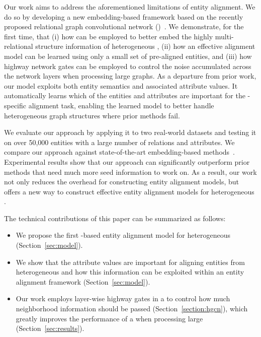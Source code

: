 Our work aims to address the aforementioned limitations of entity alignment. We do so by developing a new embedding-based framework based
on the recently proposed relational graph convolutional network (\RGCN)~\cite{Schlichtkrull2017Modeling}. We demonstrate, for the first
time, that (i) how \RGCNs can be employed to better embed the highly multi-relational structure information of heterogeneous \KGs, (ii) how
an effective alignment model can be learned using only a small set of pre-aligned entities, and (iii) how highway network gates can be
employed to control the noise accumulated across the network layers when processing large graphs. As a departure from prior work, our model
exploits both entity semantics and associated attribute values. It automatically learns which of the entities and attributes are important
for the \KG-specific alignment task, enabling the learned model to better handle heterogeneous graph structures where prior methods fail.

We evaluate our approach by applying it to two real-world datasets and testing it on over 50,000 entities with a large number of relations
and attributes. We compare our approach against state-of-the-art embedding-based
methods~\cite{hao2016joint,chen2016multilingual,sun2017cross,zhu2017iterative}. Experimental results show that our approach can
significantly outperform prior methods that need much more seed information to work on. As a result, our work not only reduces the
overhead for constructing entity alignment models, but offers a new way to construct effective entity alignment models for heterogeneous
\KGs.


	
	The technical contributions of this paper can be summarized as follows:
	\begin{itemize}
		\item We propose the first \RGCN-based entity alignment model for heterogeneous \KGs (Section~\ref {sec:model}).
		
        \item We show that the attribute values are important for aligning entities from heterogeneous \KGs and how this information can
            be exploited within an entity alignment framework (Section~\ref{sec:model}).

		\item Our work employs layer-wise highway gates in a \RGCN to control how much neighborhood information should be
passed (Section~\ref{section:hgcn}), which greatly improves the performance of a \RGCN when processing
large \KGs (Section~\ref{sec:results}).
		
		
	\end{itemize}
